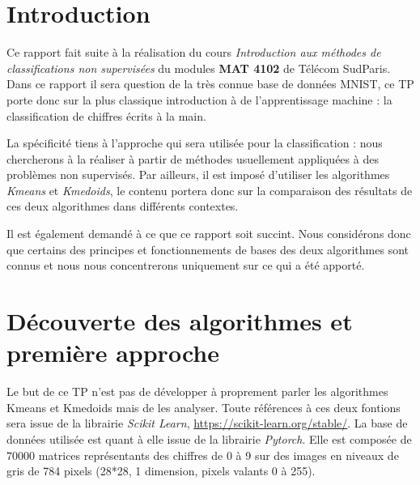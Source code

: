 \documentclass{article}
\begin{document}
\newpage


\section{Introduction}
Ce rapport fait suite à la réalisation du cours \textit{Introduction aux méthodes de classifications non supervisées} du modules \textbf{MAT 4102} de Télécom SudParis. \newline
Dans ce rapport il sera question de la très connue base de données MNIST, ce TP porte donc sur la plus classique introduction à de l'apprentissage machine : la classification de chiffres écrits à la main.  

La spécificité tiens à l'approche qui sera utilisée pour la classification : nous chercherons à la réaliser à partir de méthodes usuellement appliquées à des problèmes non supervisés. 
Par ailleurs, il est imposé d'utiliser les algorithmes \textit{Kmeans} et \textit{Kmedoids}, le contenu portera donc sur la comparaison des résultats de ces deux algorithmes dans différents contextes.

\vspace{2mm}
Il est également demandé à ce que ce rapport soit succint. Nous considérons donc que certains des principes et fonctionnements de bases des deux algorithmes sont connus et nous nous concentrerons uniquement sur ce qui a été apporté.


\newpage

\section{Découverte des algorithmes et première approche}
\vspace{4mm}

Le but de ce TP n'est pas de développer à proprement parler les algorithmes Kmeans et Kmedoids mais de les analyser. Toute références à ces deux fontions sera issue de la librairie \textit{Scikit Learn},  \url{https://scikit-learn.org/stable/}. La base de données utilisée est quant à elle issue de la librairie \textit{Pytorch}. Elle est composée de $70000$ matrices représentants des chiffres de 0 à 9 sur des images en niveaux de gris de 784 pixels (28*28, 1 dimension, pixels valants 0 à 255). 
\end{document}
